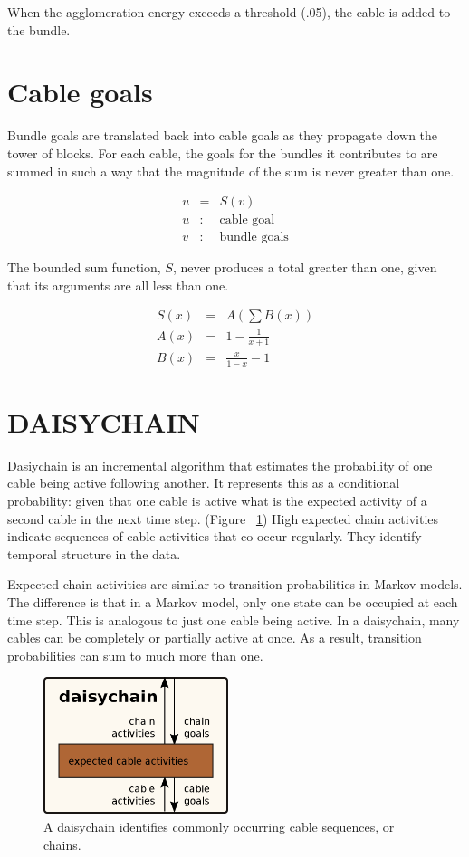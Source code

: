 \documentclass[oneside,twocolumn]{article}
\begin{document}
When the agglomeration energy exceeds a threshold (.05), the cable is added to the bundle.

\section*{\color{copper} Cable goals}
        
Bundle goals are translated back into cable goals as they propagate down the tower of blocks. For each cable, the goals for the bundles it contributes to are summed in such a way that the magnitude of the sum is never greater than one.

\begin{eqnarray*}
u &=& S(v)\\ 
u &:& \mbox{cable goal}\\
v &:& \mbox{bundle goals}
\end{eqnarray*}

The bounded sum function, $S$, never produces a total greater than one, given that its arguments are all less than one.

\begin{eqnarray*}
S(x) & = & A \left (\sum B(x) \right ) \\
A(x) & = & 1 - \frac{1}{x + 1} \\ 
B(x) & = & \frac{x}{1 - x} - 1
\end{eqnarray*}


\section*{\color{copper} DAISYCHAIN}

Dasiychain is an incremental algorithm that estimates the probability of one cable being active following another. It represents this as a conditional probability: given that one cable is active what is the expected activity of a second cable in the next time step. (Figure ~\ref{daisychain}) High expected chain activities indicate sequences of cable activities that co-occur regularly. They identify temporal structure in the data. 

Expected chain activities are similar to transition probabilities in Markov models. The difference is that in a Markov model, only one state can be occupied at each time step. This is analogous to just one cable being active. In a daisychain, many cables can be completely or partially active at once. As a result, transition probabilities can sum to much more than one. 

\begin{figure}[ht]
\centering
\includegraphics[height=4.0cm]{figs/daisychain.png}
\caption{A daisychain identifies commonly occurring cable sequences, or chains.}
\label{daisychain}
\end{figure}
\end{document}
